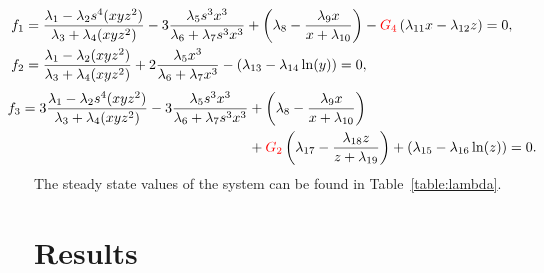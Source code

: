 \documentclass{svjour3}
\begin{document}
{\footnotesize  
\begin{align}
&\hspace{-1.2cm} f_1=\frac{\lambda_1-\lambda_2s^4(xyz^2)}{\lambda_3+\lambda_4(xyz^2)}-3\frac{\lambda_5s^3 x^3}		{\lambda_6+\lambda_7 s^3 x^3}+\left(\lambda_{8}-\frac{\lambda_{9}x}{x+\lambda_{10}}\right)-{\color{red}G_{4}}\left( \lambda_{11}x-\lambda_{12}z\right)=0,\\
&\hspace{-1.2cm} f_2=\frac{\lambda_1-\lambda_2(xyz^2)}{\lambda_3+\lambda_4(xyz^2)}+2\frac{\lambda_5 x^3}{\lambda_6+\lambda_7 x^3}- (\lambda_{13}-\lambda_{14} \ln(y))=0,
\end{align}
\vspace{-0.5cm}
\begin{align}
\hspace{-0.7cm} f_3=3\frac{\lambda_1-\lambda_2s^4(xyz^2)}{\lambda_3+\lambda_4(xyz^2)}-3\frac{\lambda_5 s^3 x^3}{\lambda_6+\lambda_7 s^3 x^3} &+\left(\lambda_{8}-\frac{\lambda_{9}x}{x+\lambda_{10}}\right) \\ \nonumber
& +{\color{red}G_{2}}\left(\lambda_{17}-\frac{\lambda_{18}z}{z+\lambda_{19}}\right) + (\lambda_{15}-\lambda_{16}\ln(z))=0.
\end{align}}
The steady state values of the system can be found in Table~\ref{table:lambda}.
\section{Results}
\end{document}
